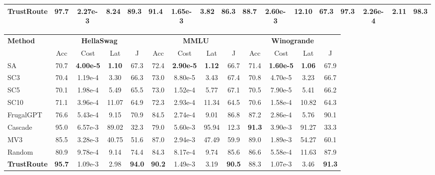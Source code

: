 \documentclass[acmsmall,screen,review,anonymous]{acmart}
\begin{document}
\begin{table}[t]
\begin{tabular}{lcccc cccc cccc cccc}
\textbf{TrustRoute} & 97.7 & 2.27e-3 & 8.24  & \textbf{89.3} & 91.4 & 1.65e-3          & \textbf{3.82}  & \textbf{86.3} & 88.7 & 2.60e-3          & 12.10          & 67.3 & \textbf{97.3} & 2.26e-4          & 2.11          & \textbf{98.3} \\
\bottomrule
\end{tabular}

\vspace{8pt}

\begin{tabular}{lcccc cccc cccc}
\toprule
\multirow{2}{*}{\textbf{Method}} &
\multicolumn{4}{c}{\textbf{HellaSwag}} &
\multicolumn{4}{c}{\textbf{MMLU}} &
\multicolumn{4}{c}{\textbf{Winogrande}} \\
\cmidrule(lr){2-5}\cmidrule(lr){6-9}\cmidrule(lr){10-13}
& Acc & Cost & Lat & J & Acc & Cost & Lat & J & Acc & Cost & Lat & J \\
\midrule
SA                  & 70.7 & \textbf{4.00e-5} & \textbf{1.10} & 67.3 & 72.4 & \textbf{2.90e-5} & \textbf{1.12} & 66.7 & 71.4 & \textbf{1.60e-5} & \textbf{1.06} & 67.9 \\
SC\textendash{}3    & 70.4 & 1.19e-4          & 3.30          & 66.3 & 73.0 & 8.80e-5          & 3.43          & 67.4 & 70.8 & 4.70e-5          & 3.23          & 66.7 \\
SC\textendash{}5    & 70.1 & 1.98e-4          & 5.49          & 65.5 & 73.0 & 1.52e-4          & 5.77          & 67.1 & 70.5 & 7.90e-5          & 5.41          & 66.2 \\
SC\textendash{}10   & 71.1 & 3.96e-4          & 11.07         & 64.9 & 72.3 & 2.93e-4          & 11.34         & 64.5 & 70.6 & 1.58e-4          & 10.82         & 64.3 \\

FrugalGPT           & 76.6 & 5.43e-4          & 9.15          & 70.9 & 84.5 & 2.74e-4          & 9.01          & 86.8 & 87.2 & 2.86e-4          & 5.76          & 90.1 \\
Cascade             & 95.0 & 6.57e-3          & 89.02         & 32.3 & 79.0 & 5.60e-3          & 95.94         & 12.3 & \textbf{91.3} & 3.90e-3          & 91.27         & 33.3 \\
MV\textendash{}3    & 85.5 & 3.28e-3          & 40.75         & 51.6 & 87.0 & 2.94e-3          & 47.49         & 59.9 & 89.0 & 1.89e-3          & 54.27         & 60.1 \\
Random              & 80.9 & 9.78e-4          & 9.14          & 74.4 & 84.3 & 8.17e-4          & 9.74          & 85.6 & 86.6 & 5.58e-4          & 11.63         & 87.9 \\

\textbf{TrustRoute} & \textbf{95.7} & 1.09e-3          & 2.98          & \textbf{94.0} & \textbf{90.2} & 1.49e-3          & 3.19          & \textbf{90.5} & 88.3 & 1.07e-3          & 3.46          & \textbf{91.3} \\
\bottomrule
    \end{tabular}
\end{table}
\end{document}
